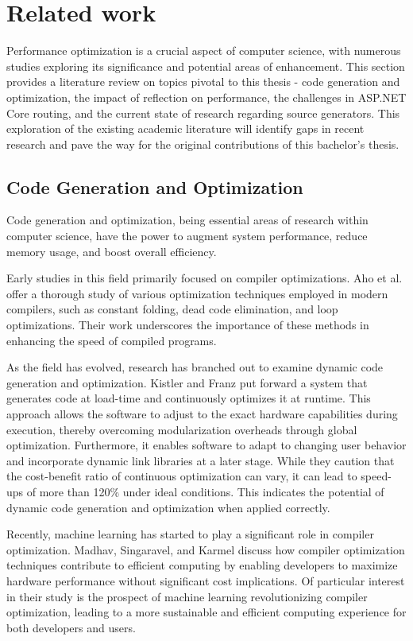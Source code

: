 \chapter{Related work}

Performance optimization is a crucial aspect of computer science, with numerous studies exploring its significance and potential areas of enhancement. This section provides a literature review on topics pivotal to this thesis - code generation and optimization, the impact of reflection on performance, the challenges in ASP.NET Core routing, and the current state of research regarding source generators. This exploration of the existing academic literature will identify gaps in recent research and pave the way for the original contributions of this bachelor's thesis.

\section{Code Generation and Optimization}

Code generation and optimization, being essential areas of research within computer science, have the power to augment system performance, reduce memory usage, and boost overall efficiency.

Early studies in this field primarily focused on compiler optimizations. Aho et al. \cite{Aho2007} offer a thorough study of various optimization techniques employed in modern compilers, such as constant folding, dead code elimination, and loop optimizations. Their work underscores the importance of these methods in enhancing the speed of compiled programs.

As the field has evolved, research has branched out to examine dynamic code generation and optimization. Kistler and Franz \cite{Kistler2003} put forward a system that generates code at load-time and continuously optimizes it at runtime. This approach allows the software to adjust to the exact hardware capabilities during execution, thereby overcoming modularization overheads through global optimization. Furthermore, it enables software to adapt to changing user behavior and incorporate dynamic link libraries at a later stage. While they caution that the cost-benefit ratio of continuous optimization can vary, it can lead to speed-ups of more than 120\% under ideal conditions. This indicates the potential of dynamic code generation and optimization when applied correctly.

Recently, machine learning has started to play a significant role in compiler optimization. Madhav, Singaravel, and Karmel \cite{Shreyas2021} discuss how compiler optimization techniques contribute to efficient computing by enabling developers to maximize hardware performance without significant cost implications. Of particular interest in their study is the prospect of machine learning revolutionizing compiler optimization, leading to a more sustainable and efficient computing experience for both developers and users.

